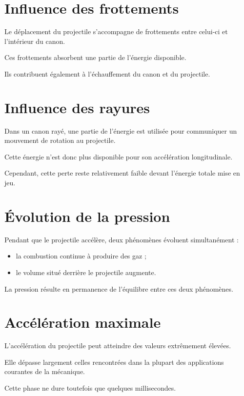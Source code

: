 \section{Influence des frottements}

Le déplacement du projectile s'accompagne de frottements entre celui-ci et
l'intérieur du canon.

Ces frottements absorbent une partie de l'énergie disponible.

Ils contribuent également à l'échauffement du canon et du projectile.

\section{Influence des rayures}

Dans un canon rayé, une partie de l'énergie est utilisée pour communiquer un
mouvement de rotation au projectile.

Cette énergie n'est donc plus disponible pour son accélération longitudinale.

Cependant, cette perte reste relativement faible devant l'énergie totale mise
en jeu.

\section{Évolution de la pression}

Pendant que le projectile accélère, deux phénomènes évoluent simultanément :

\begin{itemize}
    \item la combustion continue à produire des gaz ;
    \item le volume situé derrière le projectile augmente.
\end{itemize}

La pression résulte en permanence de l'équilibre entre ces deux phénomènes.

\section{Accélération maximale}

L'accélération du projectile peut atteindre des valeurs extrêmement élevées.

Elle dépasse largement celles rencontrées dans la plupart des applications
courantes de la mécanique.

Cette phase ne dure toutefois que quelques millisecondes.

